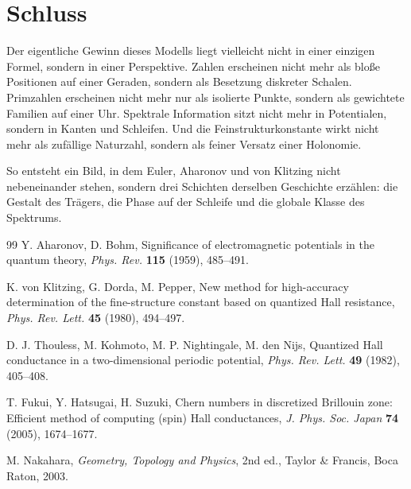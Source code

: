 \documentclass[11pt,a4paper]{article}
\theoremstyle{remark}
\begin{document}
	\section{Schluss}
	
	Der eigentliche Gewinn dieses Modells liegt vielleicht nicht in einer einzigen Formel, sondern in einer Perspektive. Zahlen erscheinen nicht mehr als bloße Positionen auf einer Geraden, sondern als Besetzung diskreter Schalen. Primzahlen erscheinen nicht mehr nur als isolierte Punkte, sondern als gewichtete Familien auf einer Uhr. Spektrale Information sitzt nicht mehr in Potentialen, sondern in Kanten und Schleifen. Und die Feinstrukturkonstante wirkt nicht mehr als zufällige Naturzahl, sondern als feiner Versatz einer Holonomie.
	
	So entsteht ein Bild, in dem Euler, Aharonov und von Klitzing nicht nebeneinander stehen, sondern drei Schichten derselben Geschichte erzählen: die Gestalt des Trägers, die Phase auf der Schleife und die globale Klasse des Spektrums.
	
	\begin{thebibliography}{99}
		Y. Aharonov, D. Bohm,
		Significance of electromagnetic potentials in the quantum theory,
		\emph{Phys. Rev.} \textbf{115} (1959), 485--491.
		
		K. von Klitzing, G. Dorda, M. Pepper,
		New method for high-accuracy determination of the fine-structure constant based on quantized Hall resistance,
		\emph{Phys. Rev. Lett.} \textbf{45} (1980), 494--497.
		
		D. J. Thouless, M. Kohmoto, M. P. Nightingale, M. den Nijs,
		Quantized Hall conductance in a two-dimensional periodic potential,
		\emph{Phys. Rev. Lett.} \textbf{49} (1982), 405--408.
		
		T. Fukui, Y. Hatsugai, H. Suzuki,
		Chern numbers in discretized Brillouin zone: Efficient method of computing (spin) Hall conductances,
		\emph{J. Phys. Soc. Japan} \textbf{74} (2005), 1674--1677.
		
		M. Nakahara,
		\emph{Geometry, Topology and Physics},
		2nd ed., Taylor \& Francis, Boca Raton, 2003.
	\end{thebibliography}
	
\end{document}
